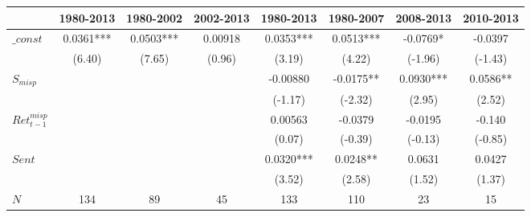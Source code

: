\begin{tabular}{l|ccc|cccc|}
\toprule
      & \multicolumn{1}{l}{1980-2013} & \multicolumn{1}{l}{1980-2002} & \multicolumn{1}{l|}{2002-2013} & \multicolumn{1}{l}{1980-2013} & \multicolumn{1}{l}{1980-2007} & \multicolumn{1}{l}{2008-2013} & \multicolumn{1}{l|}{2010-2013} \\
\midrule
$\_const$ & 0.0361*** & 0.0503*** & 0.00918 & 0.0353*** & 0.0513*** & -0.0769* & -0.0397 \\
      & (6.40) & (7.65) & (0.96) & (3.19) & (4.22) & (-1.96) & (-1.43) \\
$S_{misp}$ &       &       &       & -0.00880 & -0.0175** & 0.0930*** & 0.0586** \\
      &       &       &       & (-1.17) & (-2.32) & (2.95) & (2.52) \\
$Ret^{misp}_{t-1}$ &       &       &       & 0.00563 & -0.0379 & -0.0195 & -0.140 \\
      &       &       &       & (0.07) & (-0.39) & (-0.13) & (-0.85) \\
$Sent$ &       &       &       & 0.0320*** & 0.0248** & 0.0631 & 0.0427 \\
      &       &       &       & (3.52) & (2.58) & (1.52) & (1.37) \\
\midrule
$N$   & 134   & 89    & 45    & 133   & 110   & 23    & 15 \\
\bottomrule
\end{tabular}%
